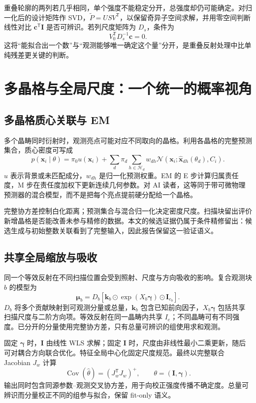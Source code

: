 \documentclass[UTF8,11pt,a4paper,fontset=fandol]{ctexart}
\newcommand{\N}{\mathcal{N}}
\newcommand{\T}{\mathsf{T}}
\begin{document}
重叠轮廓的两列若几乎相同，单个强度不能稳定分开，总强度却仍可能确定。对归一化后的设计矩阵作 SVD，$\widetilde P=USV^\T$，以保留奇异子空间求解，并用零空间判断线性对比 $\bm c^\T\bm I$ 是否可辨识。若列尺度矩阵为 $D_s$，条件为
\begin{equation}
V_0^\T D_s^{-1}\bm c=0.
\end{equation}
这将“能拟合出一个数”与“观测能够唯一确定这个量”分开，是重叠反射处理中比单纯残差更关键的判断。

\section{多晶格与全局尺度：一个统一的概率视角}
\subsection{多晶格质心关联与 EM}
多个晶畴同时衍射时，观测亮点可能对应不同取向的晶格。利用各晶格的完整预测集合，质心密度可写成
\begin{equation}
p(\bm x_i\mid\theta)=\pi_0u(\bm x_i)+
\sum_d\pi_d\sum_{h\in\mathcal H_d}w_{dh}
\N\!\left(\bm x_i;\widehat{\bm x}_{dh}(\theta_d),C_i\right).
\end{equation}
$u$ 表示背景或未匹配成分，$w_{dh}$ 是归一化预测权重。EM 的 E 步计算归属责任度，M 步在责任度加权下更新连续几何参数。对 AI 读者，这等同于带可微物理预测器的混合模型，而不是把每个亮点提前硬分配给一个晶格。

完整协方差控制白化距离；预测集合与混合归一化决定密度尺度。扫描块留出评价新增晶格是否能改善未参与精修的数据。本文的候选证据仍属于条件精修留出：候选生成与初始整数关联看到了完整输入，因此报告保留这一验证语义。

\subsection{共享全局缩放与吸收}
同一个等效反射在不同扫描位置会受到照射、尺度与方向吸收的影响。复合观测块 $b$ 的模型为
\begin{equation}
\bm\mu_b=D_b\left[
\bm k_b\odot\exp(X_b\bm\gamma)\odot\bm I_{e_b}
\right].
\end{equation}
$D_b$ 将多个贡献映射到可观测分量或总量，$\bm k_b$ 包含已知前向因子，$X_b\bm\gamma$ 包括共享扫描尺度与二阶方向项。等效反射在同一晶畴内共享 $I_e$；不同晶畴可有不同强度。已分开的分量使用完整协方差，只有总量可辨识的组使用求和观测。

固定 $\bm\gamma$ 时，$\bm I$ 由线性 WLS 求解；固定 $\bm I$ 时，尺度由非线性最小二乘更新，随后可对耦合方向联合优化。特征全局中心化固定尺度规范。最终以完整联合 Jacobian $J_w$ 计算
\begin{equation}
\operatorname{Cov}(\widehat\theta)=(J_w^\T J_w)^+,
\qquad \theta=(\bm I,\bm\gamma).
\end{equation}
输出同时包含同源参数--观测交叉协方差，用于向校正强度传播不确定度。总量可辨识而分量校正不同的组参与拟合，保留 fit-only 语义。
\end{document}
